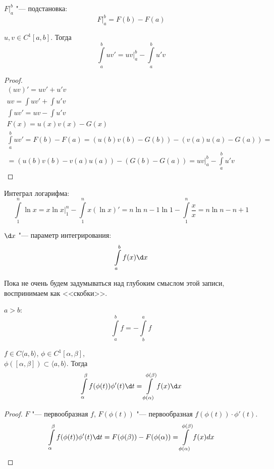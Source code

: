 \begin{Def}
	$ F \bigl|_{a}^{b}$ "--- подстановка:
	\[ F \bigl|_{a}^{b} = F(b) - F(a) \]
\end{Def}

\begin{theorem}
	$u, v \in C^1[a, b]$.
	Тогда
	\[ \int\limits_a^b u v' = uv \biggl|_a^b - \int\limits_a^b u' v \]
\end{theorem}

\begin{proof}
	\begin{gather*}
		(uv)' = u v' + u' v\\
		uv = \int u v' + \int u' v\\
		\int u v' = uv - \int u' v\\
		F(x) = u(x)v(x) - G(x) \\
		\int\limits_a^b u v' = F(b) - F(a) = (u(b)v(b) - G(b)) - (v(a)u(a) - G(a)) = \\
		= (u(b)v(b) - v(a)u(a)) - (G(b) - G(a)) = uv |_{a}^{b} - \int\limits_a^b u' v
	\end{gather*}
\end{proof}

\begin{exmp}
	Интеграл логарифма:
	\[ \int\limits_1^n \ln x = x \ln x \biggl|_{1}^{n} - \int\limits_1^n x (\ln x)' = n \ln n - 1 \ln 1 - \int\limits_1^n \frac{x}{x} = n \ln n - n + 1 \]
\end{exmp}

\begin{Def}
	$\d x$ "--- параметр интегрирования:
	\[ \int\limits_a^b f(x) \d x \]
\end{Def}
Пока не очень будем задумываться над глубоким смыслом этой записи, воспринимаем как <<скобки>>.

\begin{Def}
	$a > b$:
	\[ \int\limits_a^b f = - \int\limits_b^a f \]
\end{Def}

\begin{theorem}
	$f \in C\langle a, b \rangle$, $\phi \in C^1[ \alpha, \beta]$,\\
	$\phi([\alpha, \beta])\subset\langle a, b\rangle$.
	Тогда
	\[ \int\limits_{\alpha}^{\beta} f(\phi(t)) \phi'(t) \d t = \int\limits_{\phi(\alpha)}^{\phi(\beta)} f(x) \d x\]
\end{theorem}
\begin{proof}
	$F$ "--- первообразная $f$, $F(\phi(t))$ "--- первообразная $f(\phi (t)) \cdot \phi'(t)$.
	\[ \int\limits_{\alpha}^{\beta} f(\phi (t)) \phi'(t) \d t = F(\phi (\beta)) - F(\phi (\alpha)) = \int\limits_{\phi(\alpha)}^{\phi(\beta)} f(x) dx \]
\end{proof}